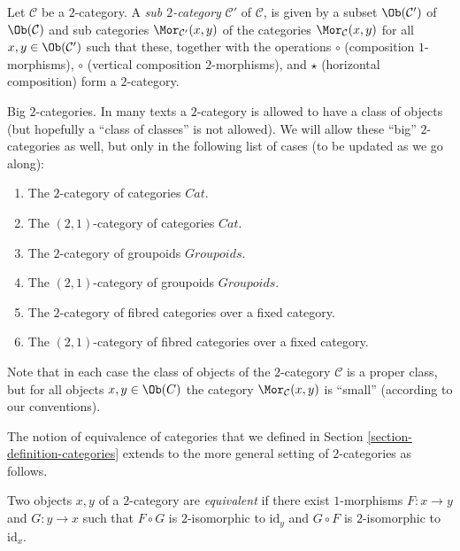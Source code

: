 \begin{definition}
\label{definition-sub-2-category}
Let $\mathcal{C}$ be a $2$-category.
A {\it sub $2$-category} $\mathcal{C}'$ of $\mathcal{C}$, is given by a subset
$\Ob(\mathcal{C}')$ of $\Ob(\mathcal{C})$
and sub categories $\Mor_{\mathcal{C}'}(x, y)$ of the
categories $\Mor_\mathcal{C}(x, y)$ for all
$x, y \in \Ob(\mathcal{C}')$ such that these, together with
the operations $\circ$ (composition $1$-morphisms), $\circ$ (vertical
composition $2$-morphisms), and $\star$ (horizontal composition)
form a $2$-category.
\end{definition}

\begin{remark}
\label{remark-big-2-categories}
Big $2$-categories.
In many texts a $2$-category is allowed to have a class of
objects (but hopefully a ``class of classes'' is not allowed).
We will allow these ``big'' $2$-categories as well, but only
in the following list of cases (to be updated as we go along):
\begin{enumerate}
\item The $2$-category of categories $\textit{Cat}$.
\item The $(2, 1)$-category of categories $\textit{Cat}$.
\item The $2$-category of groupoids $\textit{Groupoids}$.
\item The $(2, 1)$-category of groupoids $\textit{Groupoids}$.
\item The $2$-category of fibred categories over a fixed category.
\item The $(2, 1)$-category of fibred categories over a fixed category.
\end{enumerate}
Note that in each case the class of objects of the $2$-category
$\mathcal{C}$ is a proper class, but for all objects $x, y \in \Ob(C)$
the category $\Mor_\mathcal{C}(x, y)$ is ``small'' (according to
our conventions).
\end{remark}

\noindent
The notion of equivalence of categories that we defined in Section
\ref{section-definition-categories} extends to the more general setting of
$2$-categories as follows.

\begin{definition}
\label{definition-equivalence}
Two objects $x, y$ of a $2$-category are {\it equivalent} if there exist
$1$-morphisms $F : x \to y$ and $G : y \to x$ such that $F \circ G$ is
$2$-isomorphic to $\text{id}_y$ and $G \circ F$ is $2$-isomorphic to
$\text{id}_x$.
\end{definition}

